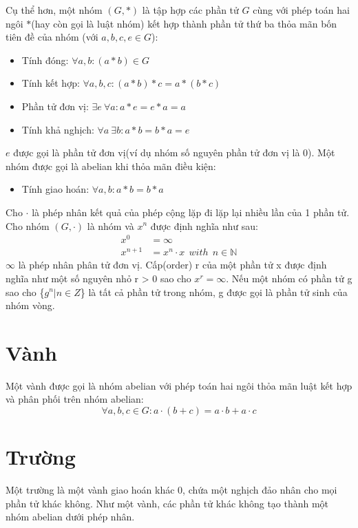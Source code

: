 \documentclass[a4paper,12pt]{report}
\begin{document}
Cụ thể hơn, một nhóm $(G, *)$ là tập hợp các phần tử $G$ cùng với phép toán hai ngôi $*$(hay còn gọi là luật nhóm) kết hợp thành phần tử thứ ba thỏa mãn bốn tiên đề của nhóm (với $ a, b , c, e \in G$):
\begin{itemize}
\item Tính đóng: $\forall a, b: (a * b) \in G$
\item Tính kết hợp: $\forall a, b, c: (a * b) * c = a * (b * c)$
\item Phần tử đơn vị: $\exists e \ \forall a: a * e = e * a = a$
\item Tính khả nghịch: $\forall a \ \exists b: a * b = b * a = e$
\end{itemize}
$e$ được gọi là phần tử đơn vị(ví dụ nhóm số nguyên phần tử đơn vị là 0). Một nhóm được gọi là abelian khi thỏa mãn điều kiện:
\begin{itemize}
\item Tính giao hoán: $\forall a,b: a * b = b * a$
\end{itemize}

Cho $\cdot$ là phép nhân kết quả của phép cộng lặp đi lặp lại nhiều lần của 1 phần tử. Cho nhóm $(G, \cdot)$ là nhóm và $x^n$ được định nghĩa như sau:
\begin{displaymath}
\begin{aligned}
x^0 & = \infty \\
x^{n + 1} & = x^n\cdot x \ \ with \ \ n \in \mathbb{N}
\end{aligned}
\end{displaymath}
$\infty$ là phép nhân phân tử đơn vị. Cấp(order) r của một phần tử x được định nghĩa như một số nguyên nhỏ r > 0 sao cho $x^r = \infty$. Nếu một nhóm có phần tử g sao cho \{$g^n | n \in Z$\} là tất cả phần tử trong nhóm, g được gọi là phần tử sinh của nhóm vòng.
\section{Vành}
Một vành được gọi là nhóm abelian với phép toán hai ngôi thỏa mãn luật kết hợp và phân phối trên nhóm abelian:
\begin{displaymath}
\forall a, b, c \in G: a\cdot (b + c) = a \cdot b + a \cdot c
\end{displaymath}
\section{Trường}
Một trường là một vành giao hoán khác 0, chứa một nghịch đảo nhân cho mọi phần tử khác không. Như một vành, các phần tử khác không tạo thành một nhóm abelian dưới phép nhân.
\end{document}

